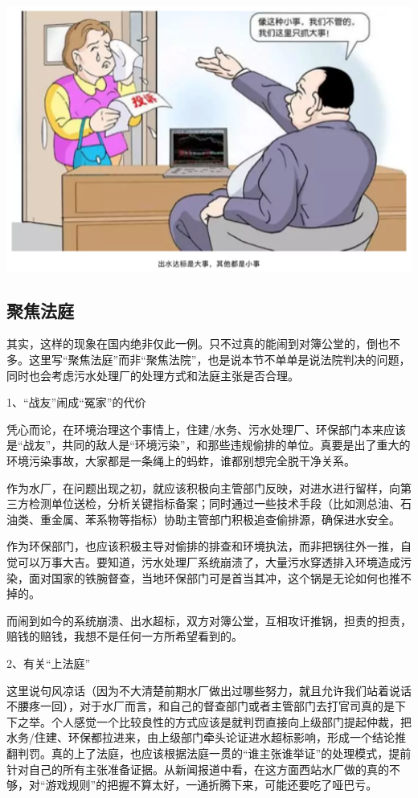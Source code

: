 \documentclass[]{book}
\begin{document}
\includegraphics[width=6.67in]{images/py3}

\hypertarget{ux805aux7126ux6cd5ux5ead}{%
\subsection{聚焦法庭}\label{ux805aux7126ux6cd5ux5ead}}

其实，这样的现象在国内绝非仅此一例。只不过真的能闹到对簿公堂的，倒也不多。这里写``聚焦法庭''而非``聚焦法院''，也是说本节不单单是说法院判决的问题，同时也会考虑污水处理厂的处理方式和法庭主张是否合理。

1、``战友''闹成``冤家''的代价

凭心而论，在环境治理这个事情上，住建/水务、污水处理厂、环保部门本来应该是``战友''，共同的敌人是``环境污染''，和那些违规偷排的单位。真要是出了重大的环境污染事故，大家都是一条绳上的蚂蚱，谁都别想完全脱干净关系。

作为水厂，在问题出现之初，就应该积极向主管部门反映，对进水进行留样，向第三方检测单位送检，分析关键指标备案；同时通过一些技术手段（比如测总油、石油类、重金属、苯系物等指标）协助主管部门积极追查偷排源，确保进水安全。

作为环保部门，也应该积极主导对偷排的排查和环境执法，而非把锅往外一推，自觉可以万事大吉。要知道，污水处理厂系统崩溃了，大量污水穿透排入环境造成污染，面对国家的铁腕督查，当地环保部门可是首当其冲，这个锅是无论如何也推不掉的。

而闹到如今的系统崩溃、出水超标，双方对簿公堂，互相攻讦推锅，担责的担责，赔钱的赔钱，我想不是任何一方所希望看到的。

2、有关``上法庭''

这里说句风凉话（因为不大清楚前期水厂做出过哪些努力，就且允许我们站着说话不腰疼一回），对于水厂而言，和自己的督查部门或者主管部门去打官司真的是下下之举。个人感觉一个比较良性的方式应该是就判罚直接向上级部门提起仲裁，把水务/住建、环保都拉进来，由上级部门牵头论证进水超标影响，形成一个结论推翻判罚。真的上了法庭，也应该根据法庭一贯的``谁主张谁举证''的处理模式，提前针对自己的所有主张准备证据。从新闻报道中看，在这方面西站水厂做的真的不够，对``游戏规则''的把握不算太好，一通折腾下来，可能还要吃了哑巴亏。
\end{document}

